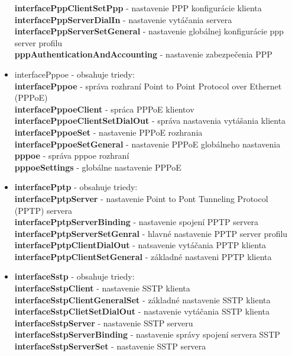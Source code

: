 \begin{itemize}
\textbf{interfacePppClientSetPpp} - nastavenie PPP konfigurácie klienta\\
\textbf{interfacePppServerDialIn} - nastavenie vytáčania servera\\
\textbf{interfacePppServerSetGeneral} - nastavenie globálnej konfigurácie ppp server profilu\\
\textbf{pppAuthenticationAndAccounting} - nastavenie zabezpečenia PPP
\item interfacePppoe - obsahuje triedy:\\
\textbf{interfacePppoe} - správa rozhraní Point to Point Protocol over Ethernet (PPPoE)\\
\textbf{interfacePppoeClient} - spráca PPPoE klientov\\
\textbf{interfacePppoeClientSetDialOut} - správa nastavenia vytášania klienta\\
\textbf{interfacePppoeSet} - nastavenie PPPoE rozhrania\\
\textbf{interfacePppoeSetGeneral} - nastavenie PPPoE globálneho nastavenia\\
\textbf{pppoe} - správa pppoe rozhraní\\
\textbf{pppoeSettings} - globálne nastavenie PPPoE
\item \textbf{interfacePptp} - obsahuje triedy:\\
\textbf{interfacePptpServer} - nastavenie Point to Pont Tunneling Protocol (PPTP) servera\\
\textbf{interfacePptpServerBinding} - nastavenie spojení PPTP servera\\
\textbf{interfacePptpServerSetGenral} - hlavné nastavenie PPTP server profilu\\
\textbf{interfacePptpClientDialOut} - natsavenie vytáčania PPTP klienta\\
\textbf{interfacePptpClientSetGeneral} - základné  nastaveni PPTP klienta
\item \textbf{interfaceSstp} - obsahuje triedy:\\
\textbf{interfaceSstpClient} - nastavenie SSTP klienta\\
\textbf{interfaceSstpClientGeneralSet} - základné nastavenie SSTP klienta\\
\textbf{interfaceSstpClietSetDialOut} - nastavenie vytáčania SSTP klienta\\
\textbf{interfaceSstpServer} - nastavenie SSTP serveru\\
\textbf{interfaceSstpServerBinding} - nastavenie správy spojení servera SSTP\\
\textbf{interfaceSstpServerSet} - nastavenie SSTP servera

\end{itemize}
